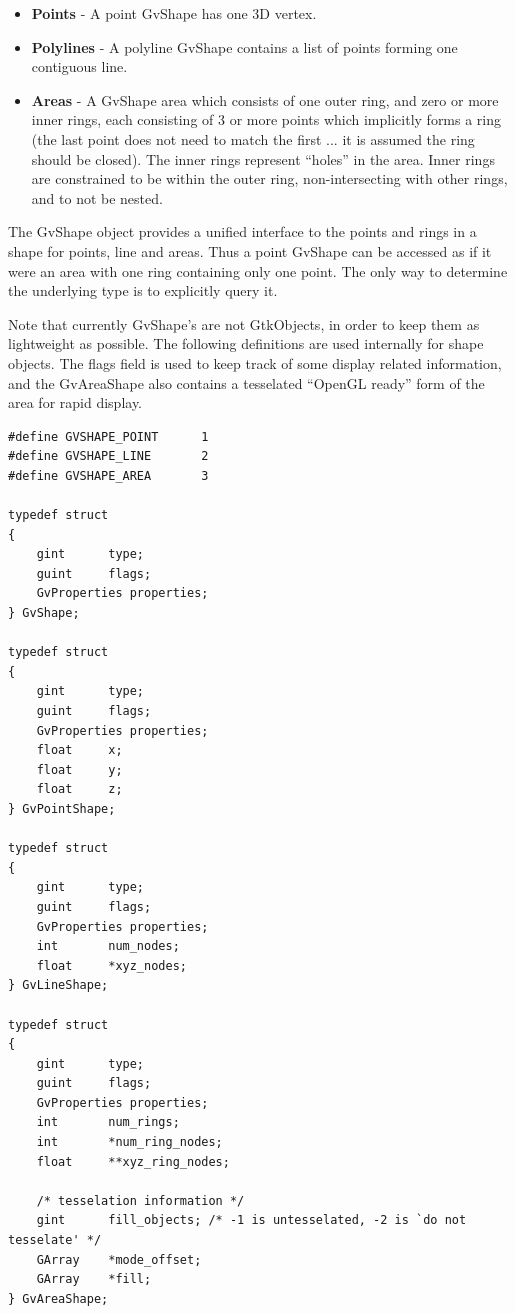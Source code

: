 \documentclass{openevreport}
\begin{document}
\begin{itemize}

\item {\bf Points} - A point GvShape has one 3D vertex.

\item {\bf Polylines} - A polyline GvShape 
contains a list of points forming one contiguous line. 

\item {\bf Areas} - A GvShape area which consists of one outer ring, and zero
or more inner rings, each consisting of 3 or more points which implicitly
forms a ring (the last point does not need to match the first ... it is 
assumed the ring should be closed).  The inner rings represent ``holes''
in the area.  Inner rings are constrained to be within the outer ring, 
non-intersecting with other rings, and to not be nested. 

\end{itemize}

The GvShape object provides a unified interface to the points and rings
in a shape for points, line and areas.  Thus a point GvShape can be 
accessed as if it were an area with one ring containing only one point.  
The only way to determine the underlying type is to explicitly query it. 

Note that currently GvShape's are not GtkObjects, in order to keep them
as lightweight as possible.  The following definitions are used internally
for shape objects.  The flags field is used to keep track of some display
related information, and the GvAreaShape also contains a tesselated
``OpenGL ready'' form of the area for rapid display.

\begin{verbatim}
#define GVSHAPE_POINT      1
#define GVSHAPE_LINE       2
#define GVSHAPE_AREA       3

typedef struct
{
    gint      type;
    guint     flags;
    GvProperties properties;
} GvShape;

typedef struct
{
    gint      type;
    guint     flags;
    GvProperties properties;
    float     x;
    float     y;
    float     z;
} GvPointShape;

typedef struct
{
    gint      type;
    guint     flags;
    GvProperties properties;
    int       num_nodes;
    float     *xyz_nodes;
} GvLineShape;

typedef struct
{
    gint      type;
    guint     flags;
    GvProperties properties;
    int       num_rings;
    int       *num_ring_nodes;
    float     **xyz_ring_nodes;

    /* tesselation information */
    gint      fill_objects; /* -1 is untesselated, -2 is `do not tesselate' */
    GArray    *mode_offset;
    GArray    *fill;
} GvAreaShape;
\end{verbatim}
\end{document}
